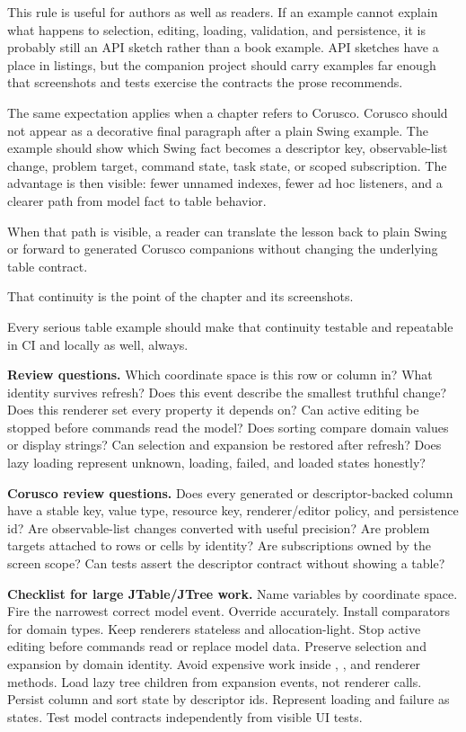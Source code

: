 This rule is useful for authors as well as readers. If an example cannot explain what happens to selection, editing, loading, validation, and persistence, it is probably still an API sketch rather than a book example. API sketches have a place in listings, but the companion project should carry examples far enough that screenshots and tests exercise the contracts the prose recommends.

The same expectation applies when a chapter refers to Corusco. Corusco should not appear as a decorative final paragraph after a plain Swing example. The example should show which Swing fact becomes a descriptor key, observable-list change, problem target, command state, task state, or scoped subscription. The advantage is then visible: fewer unnamed indexes, fewer ad hoc listeners, and a clearer path from model fact to table behavior.

When that path is visible, a reader can translate the lesson back to plain Swing or forward to generated Corusco companions without changing the underlying table contract.

That continuity is the point of the chapter and its screenshots.

Every serious table example should make that continuity testable and repeatable in CI and locally as well, always.

\textbf{Review questions.} Which coordinate space is this row or column in? What identity survives refresh? Does this event describe the smallest truthful change? Does this renderer set every property it depends on? Can active editing be stopped before commands read the model? Does sorting compare domain values or display strings? Can selection and expansion be restored after refresh? Does lazy loading represent unknown, loading, failed, and loaded states honestly?

\textbf{Corusco review questions.} Does every generated or descriptor-backed column have a stable key, value type, resource key, renderer/editor policy, and persistence id? Are observable-list changes converted with useful precision? Are problem targets attached to rows or cells by identity? Are subscriptions owned by the screen scope? Can tests assert the descriptor contract without showing a table?

\textbf{Checklist for large JTable/JTree work.} Name variables by coordinate space. Fire the narrowest correct model event. Override  accurately. Install comparators for domain types. Keep renderers stateless and allocation-light. Stop active editing before commands read or replace model data. Preserve selection and expansion by domain identity. Avoid expensive work inside , , and renderer methods. Load lazy tree children from expansion events, not renderer calls. Persist column and sort state by descriptor ids. Represent loading and failure as states. Test model contracts independently from visible UI tests.

